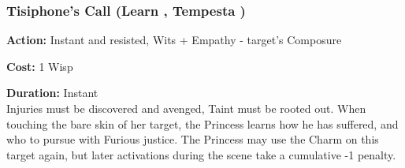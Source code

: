 \subsubsection*{Tisiphone's Call (Learn \textbullet\textbullet, Tempesta \textbullet)}

\noindent \textbf{Action:} Instant and resisted, Wits + Empathy - target's Composure

\noindent \textbf{Cost:} 1 Wisp

\noindent \textbf{Duration:} Instant\\

Injuries must be discovered and avenged, Taint must be rooted out. When touching the bare skin of her target, the Princess learns how he has suffered, and who to pursue with Furious justice. The Princess may use the Charm on this target again, but later activations during the scene take a cumulative -1 penalty.

